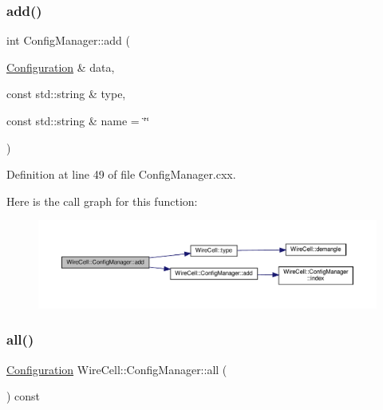 \subsubsection{\texorpdfstring{add()}{add()}\hspace{0.1cm}{\footnotesize\ttfamily [2/2]}}
{\footnotesize\ttfamily int Config\+Manager\+::add (\begin{DoxyParamCaption}\item[{\hyperlink{namespace_wire_cell_a9f705541fc1d46c608b3d32c182333ee}{Configuration} \&}]{data,  }\item[{const std\+::string \&}]{type,  }\item[{const std\+::string \&}]{name = {\ttfamily \char`\"{}\char`\"{}} }\end{DoxyParamCaption})}



Definition at line 49 of file Config\+Manager.\+cxx.

Here is the call graph for this function\+:
\nopagebreak
\begin{figure}[H]
\begin{center}
\leavevmode
\includegraphics[width=350pt]{class_wire_cell_1_1_config_manager_a8c96b5d7ab755d24a7dc9d9c2ea6cf4b_cgraph}
\end{center}
\end{figure}
\mbox{\label{class_wire_cell_1_1_config_manager_a51fb922bec307a48b4e7424d5d417955}} 
\subsubsection{\texorpdfstring{all()}{all()}}
{\footnotesize\ttfamily \hyperlink{namespace_wire_cell_a9f705541fc1d46c608b3d32c182333ee}{Configuration} Wire\+Cell\+::\+Config\+Manager\+::all (\begin{DoxyParamCaption}{ }\end{DoxyParamCaption}) const\hspace{0.3cm}{\ttfamily [inline]}}



